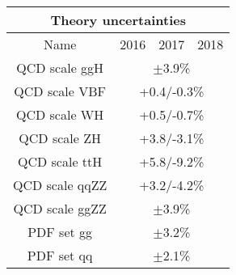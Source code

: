 \begin{table}[ht]	
	\begin{center}
		\begin{tabular}{cccc}
		\hline
		\multicolumn{4}{c}{Theory uncertainties} \\
		\hline
		Name & 2016 & 2017 & 2018 \\
		\hline
		\hline
		QCD scale ggH	& \multicolumn{3}{c}{$\pm$3.9\%} \\
		QCD scale VBF	& \multicolumn{3}{c}{+0.4/-0.3\%} \\
		QCD scale WH	& \multicolumn{3}{c}{+0.5/-0.7\%} \\
		QCD scale ZH	& \multicolumn{3}{c}{+3.8/-3.1\%} \\
		QCD scale ttH	& \multicolumn{3}{c}{+5.8/-9.2\%} \\
		\hline
		\hline
		QCD scale qqZZ	& \multicolumn{3}{c}{+3.2/-4.2\%} \\
		QCD scale ggZZ	& \multicolumn{3}{c}{$\pm$3.9\%} \\
		\hline
		\hline
		PDF set gg	& \multicolumn{3}{c}{$\pm$3.2\%} \\
		PDF set qq	& \multicolumn{3}{c}{$\pm$2.1\%} \\
		\hline
		\end{tabular}
		\label{table:theo_syst}
	\end{center}
\end{table}
